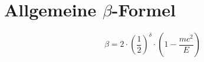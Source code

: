 \section{Allgemeine $\beta$-Formel}
\[ \beta = 2 \cdot \left( \frac{1}{2} \right)^{\delta} \cdot \left(1 - \frac{m c^2}{E}\right) \]